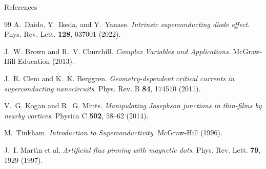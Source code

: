 \documentclass[aspectratio=169, 10pt]{beamer}
\begin{document}
\begin{frame}[allowframebreaks]{References}
\begin{thebibliography}{99}
    A.~Daido, Y.~Ikeda, and Y.~Yanase.
    \newblock \emph{Intrinsic superconducting diode effect}.
    \newblock Phys. Rev. Lett. \textbf{128}, 037001 (2022).

    J.~W. Brown and R.~V. Churchill.
    \newblock \emph{Complex Variables and Applications}.
    \newblock McGraw-Hill Education (2013).

    J.~R. Clem and K.~K. Berggren.
    \newblock \emph{Geometry-dependent critical currents in superconducting nanocircuits}.
    \newblock Phys. Rev. B \textbf{84}, 174510 (2011).

    V.~G. Kogan and R.~G. Mints.
    \newblock \emph{Manipulating Josephson junctions in thin-films by nearby vortices}.
    \newblock Physica C \textbf{502}, 58--62 (2014).

    M.~Tinkham.
    \newblock \emph{Introduction to Superconductivity}.
    \newblock McGraw-Hill (1996).

    J.~I. Mart{\'\i}n et al.
    \newblock \emph{Artificial flux pinning with magnetic dots}.
    \newblock Phys. Rev. Lett. \textbf{79}, 1929 (1997).
  \end{thebibliography}
\end{frame}

\appendix
\end{document}
